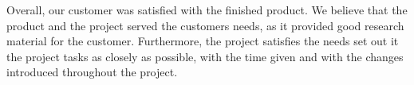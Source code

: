 \documentclass[../document]{subfiles}
\begin{document}
Overall, our customer was satisfied with the finished product. We believe that the product and the project served the customers needs, as it provided good research material for the customer. Furthermore, the project satisfies the needs set out it the project tasks as closely as possible, with the time given and with the changes introduced throughout the project.
\end{document}
